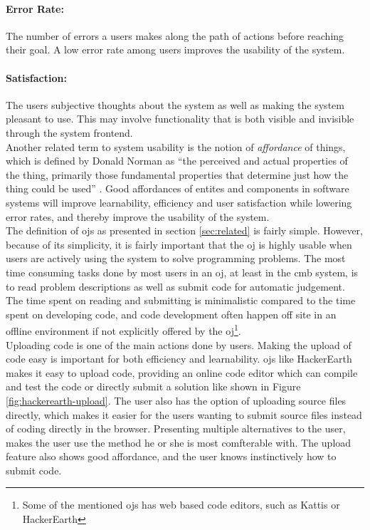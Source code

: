 \paragraph*{Error Rate:} The number of errors a users makes along the path of actions before reaching their goal. A low error rate among users improves the usability of the system.

\paragraph*{Satisfaction:} The users subjective thoughts about the system as well as making the system pleasant to use. This may involve functionality that is both visible and invisible through the system frontend. \\

Another related term to system usability is the notion of \textit{affordance} of things, which is defined by Donald Norman as ``the perceived and actual properties of the thing, primarily those fundamental properties that determine just how the thing could be used'' \cite{norman1988design}. Good affordances of entites and components in software systems will improve learnability, efficiency and user satisfaction while lowering error rates, and thereby improve the usability of the system. \\

The definition of \gls{ojs} as presented in section \ref{sec:related} is fairly simple. However, because of its simplicity, it is fairly important that the \gls{oj} is highly usable when users are actively using the system to solve programming problems. The most time consuming tasks done by most users in an \gls{oj}, at least in the \gls{cmb} system, is to read problem descriptions as well as submit code for automatic judgement. The time spent on reading and submitting is minimalistic compared to the time spent on developing code, and code development often happen off site in an offline environment if not explicitly offered by the \gls{oj}\footnote{Some of the mentioned \gls{ojs} has web based code editors, such as Kattis \cite{KATTIS} or HackerEarth\cite{HACKEREARTH}}. \\

Uploading code is one of the main actions done by users. Making the upload of code easy is important for both efficiency and learnability. \gls{ojs} like HackerEarth makes it easy to upload code, providing an online code editor which can compile and test the code or directly submit a solution like shown in Figure \ref{fig:hackerearth-upload}. The user also has the option of uploading source files directly, which makes it easier for the users wanting to submit source files instead of coding directly in the browser. Presenting multiple alternatives to the user, makes the user use the method he or she is most comfterable with. The upload feature also shows good affordance, and the user knows instinctively how to submit code. \\

